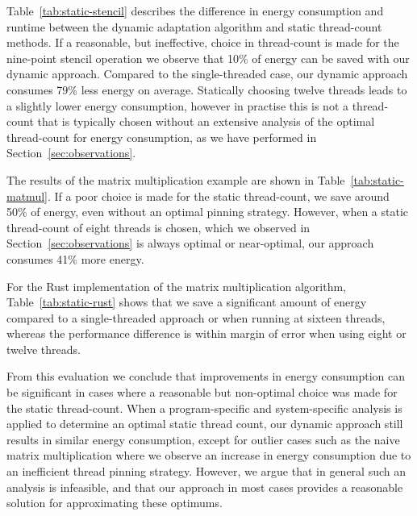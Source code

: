 Table~\ref{tab:static-stencil} describes the difference in energy consumption and runtime between
the dynamic adaptation algorithm and static thread-count methods. If a reasonable, but ineffective,
choice in thread-count is made for the nine-point stencil operation we observe that 10\% of energy
can be saved with our dynamic approach. Compared to the single-threaded case, our dynamic approach
consumes 79\% less energy on average. Statically choosing twelve threads leads to a slightly lower
energy consumption, however in practise this is not a thread-count that is typically chosen without
an extensive analysis of the optimal thread-count for energy consumption, as we have performed in
Section~\ref{sec:observations}.

The results of the matrix multiplication example are shown in Table~\ref{tab:static-matmul}. If a
poor choice is made for the static thread-count, we save around 50\% of energy, even without an
optimal pinning strategy. However, when a static thread-count of eight threads is chosen, which we
observed in Section~\ref{sec:observations} is always optimal or near-optimal, our approach consumes
41\% more energy.

For the Rust implementation of the matrix multiplication algorithm, Table~\ref{tab:static-rust}
shows that we save a significant amount of energy compared to a single-threaded approach or when
running at sixteen threads, whereas the performance difference is within margin of error when using
eight or twelve threads.

From this evaluation we conclude that improvements in energy consumption can be significant in cases
where a reasonable but non-optimal choice was made for the static thread-count. When a
program-specific and system-specific analysis is applied to determine an optimal static thread
count, our dynamic approach still results in similar energy consumption, except for outlier cases
such as the naive matrix multiplication where we observe an increase in energy consumption due to an
inefficient thread pinning strategy. However, we argue that in general such an analysis is
infeasible, and that our approach in most cases provides a reasonable solution for approximating
these optimums.

